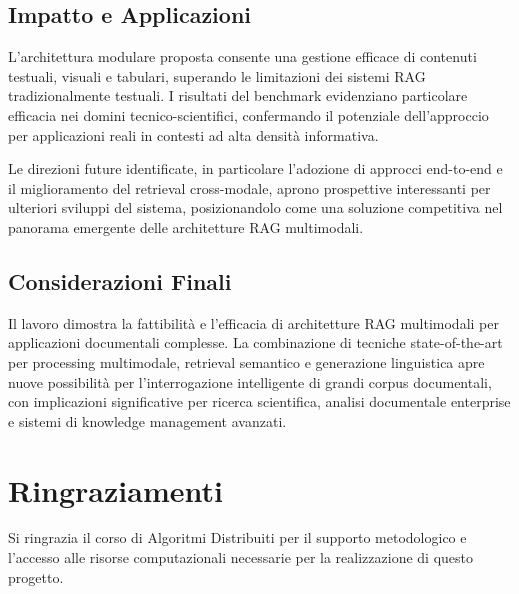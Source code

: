 \documentclass[12pt,a4paper]{article}
\begin{document}
\subsection{Impatto e Applicazioni}
L'architettura modulare proposta consente una gestione efficace di contenuti testuali, visuali e tabulari, superando le limitazioni dei sistemi RAG tradizionalmente testuali. I risultati del benchmark evidenziano particolare efficacia nei domini tecnico-scientifici, confermando il potenziale dell'approccio per applicazioni reali in contesti ad alta densità informativa.

Le direzioni future identificate, in particolare l'adozione di approcci end-to-end e il miglioramento del retrieval cross-modale, aprono prospettive interessanti per ulteriori sviluppi del sistema, posizionandolo come una soluzione competitiva nel panorama emergente delle architetture RAG multimodali.

\subsection{Considerazioni Finali}
Il lavoro dimostra la fattibilità e l'efficacia di architetture RAG multimodali per applicazioni documentali complesse. La combinazione di tecniche state-of-the-art per processing multimodale, retrieval semantico e generazione linguistica apre nuove possibilità per l'interrogazione intelligente di grandi corpus documentali, con implicazioni significative per ricerca scientifica, analisi documentale enterprise e sistemi di knowledge management avanzati.

\section*{Ringraziamenti}
Si ringrazia il corso di Algoritmi Distribuiti per il supporto metodologico e l'accesso alle risorse computazionali necessarie per la realizzazione di questo progetto.
\end{document}
